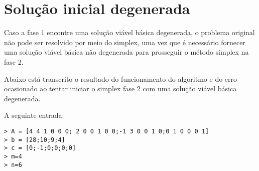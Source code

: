 \documentclass[
	12pt,				%
	openright,			%
	oneside,			%
	a4paper,			%
	english,			%
	french,				%
	spanish,			%
	brazil,				%
	]{abntex2}
\begin{document}
\section{Solução inicial degenerada}
Caso a fase 1 encontre uma solução viável básica degenerada, o problema original não pode ser resolvido por meio do simplex, uma vez que é necessário fornecer uma solução viável básica não degenerada para prosseguir o método simplex na fase 2.

Abaixo está transcrito o resultado do funcionamento do algoritmo e do erro ocasionado ao tentar iniciar o simplex fase 2 com uma solução viável básica degenerada.

A seguinte entrada:
\begin{verbatim}
> A = [4 4 1 0 0 0; 2 0 0 1 0 0;-1 3 0 0 1 0;0 1 0 0 0 1]
> b = [28;10;9;4]
> c = [0;-1;0;0;0;0]
> m=4
> n=6
\end{verbatim}
\end{document}
